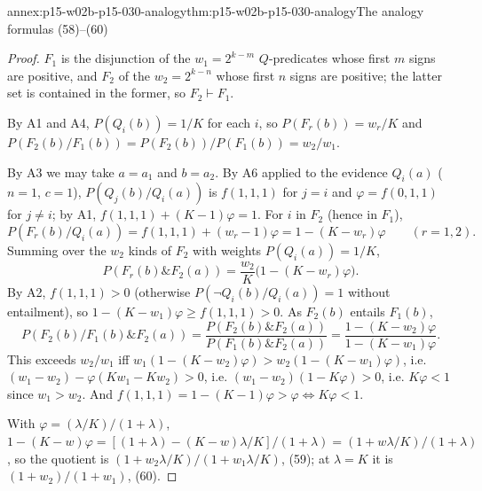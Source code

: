 \begin{annexitem}{annex:p15-w02b-p15-030-analogy}{thm:p15-w02b-p15-030-analogy}{The analogy formulas (58)--(60)}
\begin{proof}
\(F_1\) is the disjunction of the \(w_1=2^{k-m}\) \(Q\)-predicates whose first
\(m\) signs are positive, and \(F_2\) of the \(w_2=2^{k-n}\) whose first \(n\)
signs are positive; the latter set is contained in the former, so
\(F_2\vdash F_1\).

By A1 and A4, \(P(Q_i(b))=1/K\) for each \(i\), so \(P(F_r(b))=w_r/K\) and
\(P(F_2(b)/F_1(b))=P(F_2(b))/P(F_1(b))=w_2/w_1\).

By A3 we may take \(a=a_1\) and \(b=a_2\). By A6 applied to the evidence
\(Q_i(a)\) (\(n=1\), \(c=1\)),
\(P(Q_j(b)/Q_i(a))\) is \(f(1,1,1)\) for \(j=i\) and \(\varphi=f(0,1,1)\) for
\(j\neq i\); by A1, \(f(1,1,1)+(K-1)\varphi=1\). For \(i\) in \(F_2\) (hence in
\(F_1\)),
\[
 P(F_r(b)/Q_i(a))=f(1,1,1)+(w_r-1)\varphi=1-(K-w_r)\varphi\qquad(r=1,2).
\]
Summing over the \(w_2\) kinds of \(F_2\) with weights \(P(Q_i(a))=1/K\),
\[
 P(F_r(b)\&F_2(a))=\frac{w_2}{K}\bigl(1-(K-w_r)\varphi\bigr).
\] By A2,
\(f(1,1,1)>0\) (otherwise \(P(\neg Q_i(b)/Q_i(a))=1\) without entailment), so
\(1-(K-w_1)\varphi\geq f(1,1,1)>0\). As \(F_2(b)\) entails \(F_1(b)\),
\[
 P(F_2(b)/F_1(b)\&F_2(a))=\frac{P(F_2(b)\&F_2(a))}{P(F_1(b)\&F_2(a))}
 =\frac{1-(K-w_2)\varphi}{1-(K-w_1)\varphi}.
\]
This exceeds \(w_2/w_1\) iff
\(w_1(1-(K-w_2)\varphi)>w_2(1-(K-w_1)\varphi)\), i.e.
\((w_1-w_2)-\varphi(Kw_1-Kw_2)>0\), i.e. \((w_1-w_2)(1-K\varphi)>0\), i.e.
\(K\varphi<1\) since \(w_1>w_2\). And \(f(1,1,1)=1-(K-1)\varphi>\varphi\iff
K\varphi<1\).

With \(\varphi=(\lambda/K)/(1+\lambda)\),
\(1-(K-w)\varphi=[(1+\lambda)-(K-w)\lambda/K]/(1+\lambda)=(1+w\lambda/K)/(1+\lambda)\),
so the quotient is \((1+w_2\lambda/K)/(1+w_1\lambda/K)\), (59); at \(\lambda=K\)
it is \((1+w_2)/(1+w_1)\), (60).
\end{proof}
\end{annexitem}

